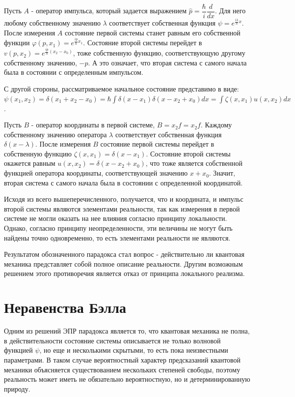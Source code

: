 \documentclass[%
master,         %
subf,           %
href,           %
,times         %
]{disser}
\numberwithin{equation}{section}
\numberwithin{figure}{section}
\begin{document}
Пусть $A$ - оператор импульса, который задается выражением $\hat{p} = \dfrac{\hbar}{i}\dfrac{d}{dx}$. Для него любому собственному значению $\lambda$ соответствует собственная функция $\psi = e^{\frac{i\lambda}{\hbar}x}$. После измерения $A$ состояние первой системы станет равным его собственной функции $\varphi(p, x_1) = e^{\frac{ip}{\hbar}x_1}$. Состояние второй системы перейдет в $v(p, x_2) = e^{\frac{ip}{\hbar}(x_2-x_0)}$, тоже собственную функцию, соответствующую другому собственному значению, $-p$. А это означает, что вторая система с самого начала была в состоянии с определенным импульсом.

С другой стороны, рассматриваемое начальное состояние представимо в виде: $\psi(x_1, x_2) = \delta(x_1 + x_2 - x_0) = \hbar\int\delta(x - x_1)\delta (x - x_2 + x_0)dx = \int\zeta(x, x_1)u(x, x_2)dx$. 

Пусть $B$ - оператор координаты в первой системе, $B = \hat{x_2}f = x_2f$. Каждому собственному значению оператора $\lambda$ соответствует собственная функция $\delta(x - \lambda)$. После измерения $B$ состояние первой системы перейдет в собственную функцию $\zeta(x, x_1) = \delta(x - x_1)$. Состояние второй системы окажется равным $u(x, x_2) = \delta(x - x_2 + x_0)$, что тоже является собственной функцией оператора координаты, соответствующей значению $x + x_0$. Значит, вторая система с самого начала была в состоянии с определенной координатой.

Исходя из всего вышеперечисленного, получается, что и координата, и импульс второй системы являются элементами реальности, так как измерения в первой системе не могли оказать на нее влияния согласно принципу локальности. Однако, согласно принципу неопределенности, эти величины не могут быть найдены точно одновременно, то есть элементами реальности не являются.

Результатом обозначенного парадокса стал вопрос - действительно ли квантовая механика представляет собой полное описание реальности. Другим возможным решением этого противоречия является отказ от принципа локального реализма.

\section{Неравенства Бэлла}
Одним из решений ЭПР парадокса является то, что квантовая механика не полна, в действительности состояние системы описывается не только волновой функцией  $\psi$, но еще и несколькими скрытыми, то есть пока неизвестными параметрами. В таком случае вероятностный характер предсказаний квантовой механики объясняется существованием нескольких степеней свободы, поэтому реальность может иметь не обязательно вероятностную, но и детерминированную природу.
\end{document}
